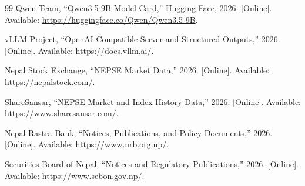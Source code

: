 \documentclass[12pt,a4paper]{report}
\begin{document}
\begin{thebibliography}{99}
Qwen Team, ``Qwen3.5-9B Model Card,'' Hugging Face, 2026. [Online]. Available: \url{https://huggingface.co/Qwen/Qwen3.5-9B}.

vLLM Project, ``OpenAI-Compatible Server and Structured Outputs,'' 2026. [Online]. Available: \url{https://docs.vllm.ai/}.

Nepal Stock Exchange, ``NEPSE Market Data,'' 2026. [Online]. Available: \url{https://nepalstock.com/}.

ShareSansar, ``NEPSE Market and Index History Data,'' 2026. [Online]. Available: \url{https://www.sharesansar.com/}.

Nepal Rastra Bank, ``Notices, Publications, and Policy Documents,'' 2026. [Online]. Available: \url{https://www.nrb.org.np/}.

Securities Board of Nepal, ``Notices and Regulatory Publications,'' 2026. [Online]. Available: \url{https://www.sebon.gov.np/}.

\end{thebibliography}
\endgroup
\end{document}
